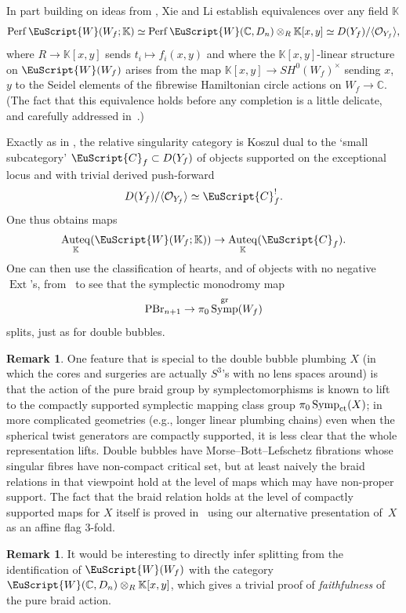 \documentclass[pdftex]{sigma}
\DeclareMathOperator{\Auteq}{Auteq}
\DeclareMathOperator{\Ext}{Ext}
\newcommand{\scrC}{\EuScript{C}}
\def\scrW{\EuScript{W}}
\DeclareMathOperator{\Symp}{Symp}
\def\bK{\mathbb{K}}
\def\bC{\mathbb{C}}
\theoremstyle{definition}
\newtheorem{rmk}[thm]{Remark}
\numberwithin{equation}{section}
\begin{document}
 In part building on ideas from \cite{LS}, Xie and Li establish equivalences over any field $\bK$
 \[
\mathrm{Perf}\, \scrW(W_f;\bK) \simeq \operatorname{Perf} \scrW(\bC,D_n) \otimes_R \bK[x,y] \simeq D(Y_f) / \langle \mathcal{O}_{Y_f}\rangle,
 \]
where $R \to \bK[x,y]$ sends $t_i \mapsto f_i(x,y)$ and where the $\bK[x,y]$-linear structure on $\scrW(W_f)$ arises from the map $\bK[x,y] \to SH^0(W_f)^{\times}$ sending $x$, $y$ to the Seidel elements of the fibrewise Hamiltonian circle actions on $W_f \to \bC$. (The fact that this equivalence holds before any completion is a little delicate, and carefully addressed in~\cite{Xie-Li}.)

Exactly as in \cite{Smith-Wemyss}, the relative singularity category is Koszul dual to the `small subcategory' $\scrC_f \subset D(Y_f)$ of objects supported on the exceptional locus and with trivial derived push-forward
\[
D(Y_f) / \langle \mathcal{O}_{Y_f}\rangle \simeq \scrC_f^{!}.
\]
One thus obtains maps
\[
\Auteq_{\bK}(\scrW(W_f;\bK)) \to \Auteq_{\bK}(\scrC_f).
\]
One can then use the classification of hearts, and of objects with no negative $\Ext$'s, from~\cite{Hara-Wemyss} to see that the symplectic monodromy map
\[
{\rm PBr}_{n+1} \to \pi_0\Symp^{\rm gr}(W_f)
\]
splits, just as for double bubbles.

\begin{rmk}
One feature that is special to the double bubble plumbing $X$ (in which the cores and surgeries are actually $S^3$'s with no lens spaces around) is that the action of the pure braid group by symplectomorphisms is known to lift to the compactly supported symplectic mapping class group $\pi_0\Symp_{\rm ct}(X)$; in more complicated geometries (e.g., longer linear plumbing chains) even when the spherical twist generators are compactly supported, it is less clear that the whole representation lifts. Double bubbles have Morse--Bott--Lefschetz fibrations whose singular fibres have non-compact critical set, but at least naively the braid relations in that viewpoint hold at the level of maps which may have non-proper support. The fact that the braid relation holds at the level of compactly supported maps for $X$ itself is proved in~\cite{Smith-Wemyss} using our alternative presentation of~$X$ as an affine flag $3$-fold.
\end{rmk}

 \begin{rmk}\label{rmk:multibubble as surface category}
 It would be interesting to directly infer splitting from the identification of $\scrW(W_f)$ with the category $\scrW(\bC,D_n) \otimes_R \bK[x,y]$, which gives a trivial proof of \emph{faithfulness} of the pure braid action.
 \end{rmk}
\end{document}

